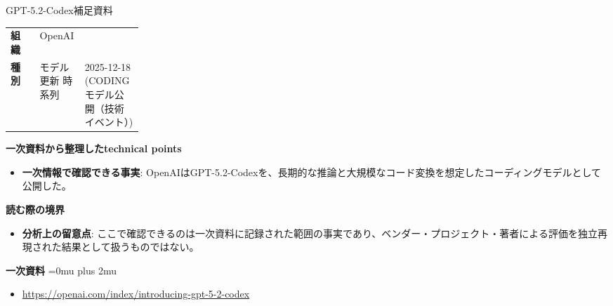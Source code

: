 \begin{technicalnote}{GPT-5.2-Codex}{補足資料}
\begingroup
\begin{tabularx}{\linewidth}{@{}>{\bfseries}p{0.22\linewidth}X@{}}
組織 & OpenAI \\
種別 & モデル更新
時系列 & 2025-12-18 (CODING モデル公開（技術イベント）) \\
\end{tabularx}
\smallskip
{\bfseries 一次資料から整理したtechnical points}
\begin{itemize}[leftmargin=1.5em,itemsep=0.35em]
\item \textbf{一次情報で確認できる事実}: OpenAIはGPT-5.2-Codexを、長期的な推論と大規模なコード変換を想定したコーディングモデルとして公開した。
\end{itemize}
\begin{minipage}{\linewidth}
{\bfseries 読む際の境界}
\begin{itemize}[leftmargin=1.5em,itemsep=0.35em]
\item \textbf{分析上の留意点}: ここで確認できるのは一次資料に記録された範囲の事実であり、ベンダー・プロジェクト・著者による評価を独立再現された結果として扱うものではない。
\end{itemize}
\begin{samepage}
{\bfseries 一次資料}
\begingroup\sloppy
\Urlmuskip=0mu plus 2mu\relax
\begin{itemize}[leftmargin=1.5em,itemsep=0.25em]
\item {\scriptsize\url{https://openai.com/index/introducing-gpt-5-2-codex}}
\end{itemize}
\endgroup
\end{samepage}
\end{minipage}
\endgroup
\end{technicalnote}
\medskip
